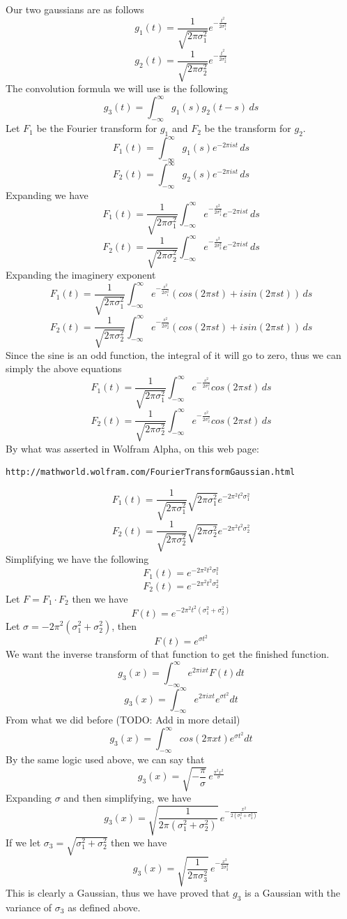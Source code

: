 \documentclass[11pt,psfig]{article}
\begin{document}
Our two gaussians are as follows
\[
g_1(t) = \frac{1}{\sqrt{2\pi \sigma_1^2}} e^{-\frac{t^2}{2\sigma_1^2}}
\]
\[
g_2(t) = \frac{1}{\sqrt{2\pi \sigma_2^2}} e^{-\frac{t^2}{2\sigma_2^2}}
\]
The convolution formula we will use is the following
\[
g_3(t) = \int_{-\infty}^{\infty}{g_1(s)g_2(t-s) \, ds}
\]
Let $F_1$ be the Fourier transform for $g_1$ and $F_2$ be the transform for $g_2$.\\
\[
F_1(t) = \int_{-\infty}^{\infty}{g_1(s) e^{-2\pi i s t} \, ds}
\]
\[
F_2(t) = \int_{-\infty}^{\infty}{g_2(s) e^{-2\pi i s t} \, ds}
\]
Expanding we have
\[
F_1(t) = \frac{1}{\sqrt{2 \pi \sigma_1^2}} \int_{-\infty}^{\infty}{e^{-\frac{s^2}{2\sigma_1^2}} e^{-2\pi i s t} \, ds}
\]
\[
F_2(t) = \frac{1}{\sqrt{2 \pi \sigma_2^2}} \int_{-\infty}^{\infty}{e^{-\frac{s^2}{2\sigma_2^2}} e^{-2\pi i s t} \, ds}
\]
Expanding the imaginery exponent
\[
F_1(t) = \frac{1}{\sqrt{2 \pi \sigma_1^2}} \int_{-\infty}^{\infty}{e^{-\frac{s^2}{2\sigma_1^2}} (cos(2\pi s t) + i sin(2\pi s t)) \, ds}
\]
\[
F_2(t) = \frac{1}{\sqrt{2 \pi \sigma_2^2}} \int_{-\infty}^{\infty}{e^{-\frac{s^2}{2\sigma_2^2}} (cos(2\pi s t) + i sin(2\pi s t)) \, ds}
\]
Since the sine is an odd function, the integral of it will go to zero, thus we can simply the above equations
\[
F_1(t) = \frac{1}{\sqrt{2 \pi \sigma_1^2}} \int_{-\infty}^{\infty}{e^{-\frac{s^2}{2\sigma_1^2}} cos(2\pi s t) \, ds}
\]
\[
F_2(t) = \frac{1}{\sqrt{2 \pi \sigma_2^2}} \int_{-\infty}^{\infty}{e^{-\frac{s^2}{2\sigma_2^2}} cos(2\pi s t) \, ds}
\]
By what was asserted in Wolfram Alpha, on this web page:
\begin{verbatim}
http://mathworld.wolfram.com/FourierTransformGaussian.html
\end{verbatim}
\[
F_1(t) = \frac{1}{\sqrt{2 \pi \sigma_1^2}} \sqrt{2 \pi \sigma_1^2} e^{-2 \pi^2 t^2 \sigma_1^2}
\]
\[
F_2(t) = \frac{1}{\sqrt{2 \pi \sigma_2^2}} \sqrt{2 \pi \sigma_2^2} e^{-2 \pi^2 t^2 \sigma_2^2}
\]
Simplifying we have the following
\[
F_1(t) = e^{-2 \pi^2 t^2 \sigma_1^2}
\]
\[
F_2(t) = e^{-2 \pi^2 t^2 \sigma_2^2}
\]
Let $F=F_1 \cdot F_2$ then we have
\[
F(t) = e^{-2 \pi^2 t^2 (\sigma_1^2 + \sigma_2^2)}
\]
Let $\sigma = -2 \pi^2 (\sigma_1^2 + \sigma_2^2)$, then 
\[
F(t) = e^{\sigma t^2}
\]
We want the inverse transform of that function to get the finished function. 
\[
g_3(x) = \int_{-\infty}^{\infty} e^{2\pi i x t} F(t) dt
\]
\[
g_3(x) = \int_{-\infty}^{\infty} e^{2\pi i x t}e^{\sigma t^2} dt
\]
From what we did before (TODO: Add in more detail)
\[
g_3(x) = \int_{-\infty}^{\infty} cos(2 \pi x t)e^{\sigma t^2} dt
\]
By the same logic used above, we can say that
\[
g_3(x) = \sqrt{-\frac{\pi}{\sigma}} \, e^{\frac{\pi^2 x^2}{\sigma}}
\]
Expanding $\sigma$ and then simplifying, we have
\[
g_3(x) = \sqrt{\frac{1}{2\pi (\sigma_1^2 + \sigma_2^2)}} \, e^{-\frac{x^2}{2(\sigma_1^2 + \sigma_2^2)}}
\]
If we let $\sigma_3 = \sqrt{\sigma_1^2 + \sigma_2^2}$ then we have
\[
g_3(x) = \sqrt{\frac{1}{2\pi \sigma_3^2}} \, e^{-\frac{x^2}{2\sigma_3^2}}
\]
This is clearly a Gaussian, thus we have proved that $g_3$ is a Gaussian with the variance of $\sigma_3$ as defined above. 
\end{document}
